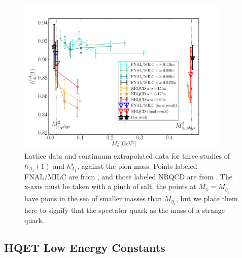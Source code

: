 \begin{figure}[htb!]
  \vspace{-20pt}
  \begin{center}
  \includegraphics[width=0.9\textwidth]{images/BsDsstar/fermilab_nrqcd_data.pdf}
  \caption{Lattice data and continuum extrapolated data for three studies of $h_{A_1}(1)$ and $h_{A_1}^s$, against the pion mass. Points labeled FNAL/MILC are from \cite{Bailey:2014tva}, and those labeled NRQCD are from \cite{Harrison:2017fmw}. The x-axis must be taken with a pinch of salt, the points at $M_{\pi}=M_{\eta_s}$ have pions in the sea of smaller masses than $M_{\eta_s}$, but we place them here to signify that the spectator quark as the mass of a strange quark. \label{fig:fermilab_data}}
  \end{center}
  \vspace{-20pt}
\end{figure}

\subsection{HQET Low Energy Constants}



